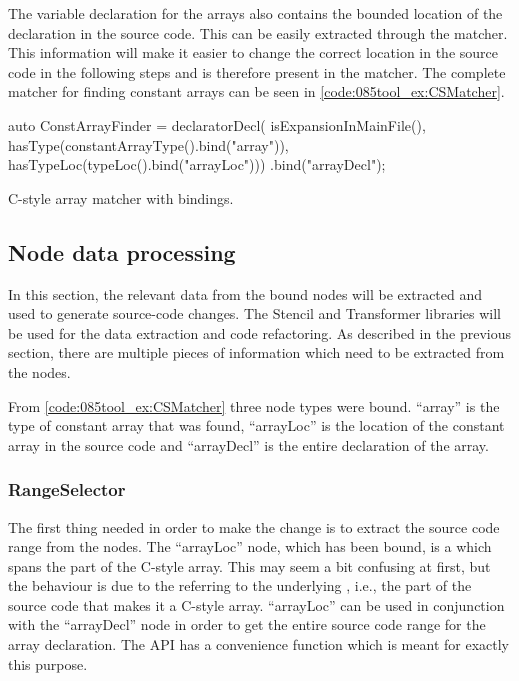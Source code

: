 The variable declaration for the arrays also contains the bounded location of the declaration in the source code. This can be easily extracted through the  matcher. This information will make it easier to change the correct location in the source code in the following steps and is therefore present in the matcher.
The complete matcher for finding constant arrays can be seen in \cref{code:085tool_ex:CSMatcher}.

\begin{listing}[H]
    \begin{cppcode}
auto ConstArrayFinder = 
    declaratorDecl(
        isExpansionInMainFile(),
        hasType(constantArrayType().bind("array")),
        hasTypeLoc(typeLoc().bind("arrayLoc")))
    .bind("arrayDecl");
    \end{cppcode}
    \caption{C-style array matcher with bindings.}
    \label{code:085tool_ex:CSMatcher}
\end{listing}

\subsection{Node data processing}

In this section, the relevant data from the bound nodes will be extracted and used to generate source-code changes. The Stencil and Transformer libraries will be used for the data extraction and code refactoring.
As described in the previous section, there are multiple pieces of information which need to be extracted from the nodes. 

From \cref{code:085tool_ex:CSMatcher} three node types were bound. ``array'' is the type of constant array that was found, ``arrayLoc'' is the location of the constant array in the source code and ``arrayDecl'' is the entire declaration of the array.

\subsubsection*{RangeSelector}
The first thing needed in order to make the change is to extract the source code range from the nodes. The ``arrayLoc'' node, which has been bound, is a  which spans the  part of the C-style array.
This may seem a bit confusing at first, but the behaviour is due to the  referring to the underlying , i.e., the part of the source code that makes it a C-style array.
``arrayLoc'' can be used in conjunction with the ``arrayDecl'' node in order to get the entire source code range for the array declaration. The  API has a convenience function  which is meant for exactly this purpose.

